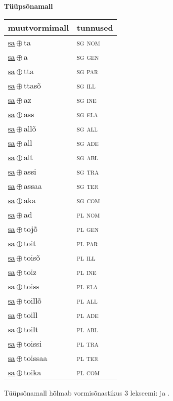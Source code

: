 

\vspace{3.5em}
\noindent \begin{minipage}{\textwidth}
\noindent \textbf{Tüüpsõnamall \,}\\

\begin{sideways}
\begin{tabular}{l l}
muutvormimall & tunnused \\
\hline
\underline{sa}\,$\oplus$\,ta & \textsc{ sg nom } \\
\underline{sa}\,$\oplus$\,a & \textsc{ sg gen } \\
\underline{sa}\,$\oplus$\,tta & \textsc{ sg par } \\
\underline{sa}\,$\oplus$\,ttasõ & \textsc{ sg ill } \\
\underline{sa}\,$\oplus$\,az & \textsc{ sg ine } \\
\underline{sa}\,$\oplus$\,ass & \textsc{ sg ela } \\
\underline{sa}\,$\oplus$\,allõ & \textsc{ sg all } \\
\underline{sa}\,$\oplus$\,all & \textsc{ sg ade } \\
\underline{sa}\,$\oplus$\,alt & \textsc{ sg abl } \\
\underline{sa}\,$\oplus$\,assi & \textsc{ sg tra } \\
\underline{sa}\,$\oplus$\,assaa & \textsc{ sg ter } \\
\underline{sa}\,$\oplus$\,aka & \textsc{ sg com } \\
\underline{sa}\,$\oplus$\,ad & \textsc{ pl nom } \\
\underline{sa}\,$\oplus$\,tojõ & \textsc{ pl gen } \\
\underline{sa}\,$\oplus$\,toit & \textsc{ pl par } \\
\underline{sa}\,$\oplus$\,toisõ & \textsc{ pl ill } \\
\underline{sa}\,$\oplus$\,toiz & \textsc{ pl ine } \\
\underline{sa}\,$\oplus$\,toiss & \textsc{ pl ela } \\
\underline{sa}\,$\oplus$\,toillõ & \textsc{ pl all } \\
\underline{sa}\,$\oplus$\,toill & \textsc{ pl ade } \\
\underline{sa}\,$\oplus$\,toilt & \textsc{ pl abl } \\
\underline{sa}\,$\oplus$\,toissi & \textsc{ pl tra } \\
\underline{sa}\,$\oplus$\,toissaa & \textsc{ pl ter } \\
\underline{sa}\,$\oplus$\,toika & \textsc{ pl com } \\
\end{tabular}
\end{sideways}
\label{tab:tüüpsõnamall-sata}

\end{minipage}

 
\vspace{1em}
\noindent Tüüpsõnamall  hõlmab vormisõnastikus 3 lekseemi:  ja .
